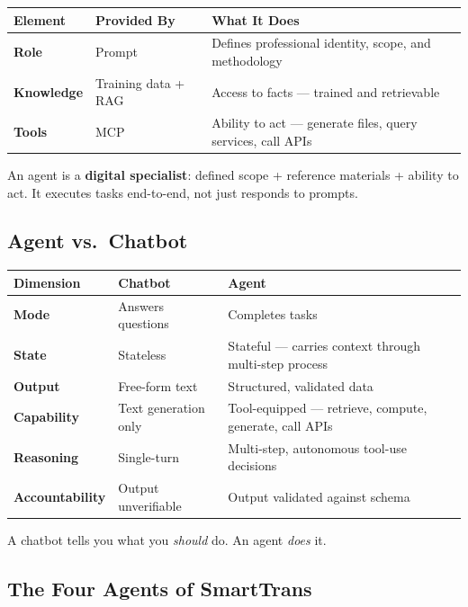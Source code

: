 \documentclass[
  paper=a4,
  fontsize=10pt,
  DIV=14,
  headings=normal,
  headsepline=true,
  parskip=half,
]{scrartcl}
\begin{document}
\medskip
\begin{tabularx}{\textwidth}{@{} l l L @{}}
\toprule

\textbf{Element} & \textbf{Provided By} & \textbf{What It Does} \\
\midrule
\textbf{Role}      & Prompt            & Defines professional identity, scope, and methodology \\
\textbf{Knowledge} & Training data + RAG & Access to facts — trained and retrievable \\
\textbf{Tools}     & MCP               & Ability to act — generate files, query services, call APIs \\
\bottomrule
\end{tabularx}
\medskip

An agent is a \textbf{digital specialist}: defined scope + reference materials + ability to act. It executes tasks end-to-end, not just responds to prompts.

\subsection{Agent vs.\ Chatbot}

\medskip
{\small
\begin{tabularx}{\textwidth}{@{} l L L @{}}
\toprule

\textbf{Dimension} & \textbf{Chatbot} & \textbf{Agent} \\
\midrule
\textbf{Mode}          & Answers questions     & Completes tasks \\
\textbf{State}         & Stateless             & Stateful — carries context through multi-step process \\
\textbf{Output}        & Free-form text        & Structured, validated data \\
\textbf{Capability}    & Text generation only  & Tool-equipped — retrieve, compute, generate, call APIs \\
\textbf{Reasoning}     & Single-turn           & Multi-step, autonomous tool-use decisions \\
\textbf{Accountability} & Output unverifiable  & Output validated against schema \\
\bottomrule
\end{tabularx}
}
\medskip

A chatbot tells you what you \emph{should} do. An agent \emph{does} it.

\subsection{The Four Agents of SmartTrans}
\end{document}
